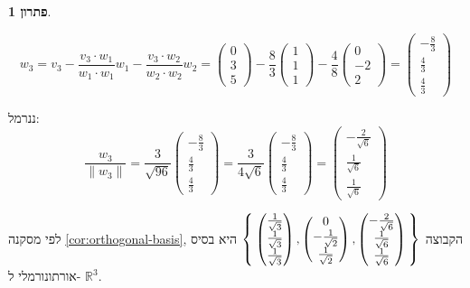 \documentclass[12pt]{report}
\theoremstyle{plain}
\theoremstyle{definition}
\newtheorem*{solution}{פתרון}
\newcommand{\R}{\mathbb{R}}
\newcommand{\0}{\mathbf{0}}
\begin{document}
\begin{solution}
\begin{enumerate}[label=\alph*.]
$$
w_3=v_3-\frac{v_3\cdot w_1}{w_1\cdot w_1}w_1-\frac{v_3\cdot w_2}{w_2\cdot w_2}w_2=\begin{pmatrix}0\\3\\5\end{pmatrix}-\frac{8}{3}\begin{pmatrix}1\\1\\1\end{pmatrix}-\frac{4}{8}\begin{pmatrix}0\\-2\\2\end{pmatrix}=\begin{pmatrix}-\frac{8}{3}\\ \frac{4}{3}\\ \frac{4}{3}\end{pmatrix}
$$

ננרמל:
$$
\frac{w_3}{\|w_3\|}=\frac{3}{\sqrt{96}}\begin{pmatrix}-\frac{8}{3}\\ \frac{4}{3}\\ \frac{4}{3}\end{pmatrix}=\frac{3}{4\sqrt{6}}\begin{pmatrix}-\frac{8}{3}\\ \frac{4}{3}\\ \frac{4}{3}\end{pmatrix}=\begin{pmatrix}-\frac{2}{\sqrt{6}}\\\frac{1}{\sqrt{6}}\\\frac{1}{\sqrt{6}}\end{pmatrix}
$$

לפי מסקנה
\ref{cor:orthogonal-basis},
הקבוצה 
$\Set{\begin{pmatrix}\frac{1}{\sqrt{3}} \\ \frac{1}{\sqrt{3}} \\ \frac{1}{\sqrt{3}}\end{pmatrix},\begin{pmatrix}0\\-\frac{1}{\sqrt{2}}\\\frac{1}{\sqrt{2}}\end{pmatrix},\begin{pmatrix}-\frac{2}{\sqrt{6}}\\\frac{1}{\sqrt{6}}\\\frac{1}{\sqrt{6}}\end{pmatrix}}$
היא בסיס אורתונורמלי ל-
$\R^3$.


\end{enumerate}
\end{solution}
\end{document}

